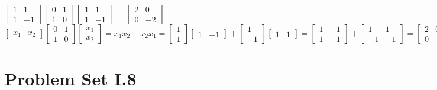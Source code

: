\documentclass{article}
\renewcommand{\(}{\left(}
\renewcommand{\)}{\right)}
\theoremstyle{plain}
\theoremstyle{plain}
\theoremstyle{definition}
\begin{document}
\begin{enumerate}[label*=\arabic*.,ref=\arabic*]
\begin{shaded}
$\begin{bmatrix} 1 & 1 \\ 1 & -1 \end{bmatrix} \begin{bmatrix} 0 & 1 \\ 1 & 0 \end{bmatrix} \begin{bmatrix} 1 & 1 \\ 1 & -1 \end{bmatrix} = \begin{bmatrix} 2 & 0 \\ 0 & -2 \end{bmatrix}$ \\

$\begin{bmatrix} x_1 & x_2 \end{bmatrix} \begin{bmatrix} 0 & 1 \\ 1 & 0 \end{bmatrix} \begin{bmatrix} x_1 \\ x_2 \end{bmatrix} = x_1x_2 + x_2x_1 = \begin{bmatrix} 1 \\ 1 \end{bmatrix} \begin{bmatrix} 1 & -1 \end{bmatrix} + \begin{bmatrix} 1 \\ -1 \end{bmatrix} \begin{bmatrix} 1 & 1 \end{bmatrix} = \begin{bmatrix} 1 & -1 \\ 1 & -1 \end{bmatrix} + \begin{bmatrix} 1 & 1 \\ -1 & -1 \end{bmatrix} = \begin{bmatrix} 2 & 0 \\ 0 & -2 \end{bmatrix}$ \\
\end{shaded}
\end{enumerate}

\section{Problem Set I.8}
\end{document}
